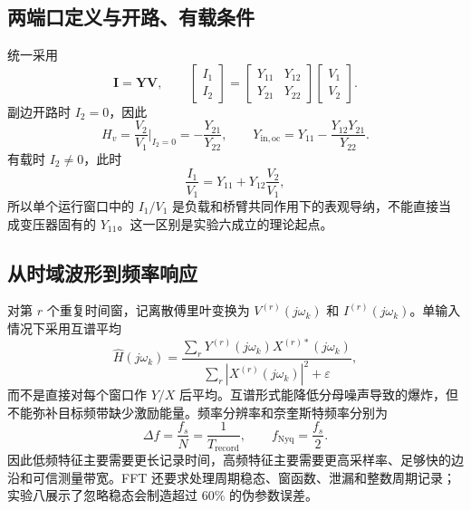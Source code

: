 \documentclass[UTF8,a4paper,12pt]{ctexart}
\begin{document}
\subsection{两端口定义与开路、有载条件}

统一采用
\begin{equation}
\mathbf I=\mathbf Y\mathbf V,\qquad
\begin{bmatrix}I_1\\I_2\end{bmatrix}
=
\begin{bmatrix}Y_{11}&Y_{12}\\Y_{21}&Y_{22}\end{bmatrix}
\begin{bmatrix}V_1\\V_2\end{bmatrix}.
\label{eq:two-port-basic}
\end{equation}
副边开路时 $I_2=0$，因此
\begin{equation}
H_v=\frac{V_2}{V_1}\bigg|_{I_2=0}=-\frac{Y_{21}}{Y_{22}},\qquad
Y_{\mathrm{in,oc}}=Y_{11}-\frac{Y_{12}Y_{21}}{Y_{22}}.
\end{equation}
有载时 $I_2\neq0$，此时
\begin{equation}
\frac{I_1}{V_1}=Y_{11}+Y_{12}\frac{V_2}{V_1},
\end{equation}
所以单个运行窗口中的 $I_1/V_1$ 是负载和桥臂共同作用下的表观导纳，不能直接当成变压器固有的 $Y_{11}$。这一区别是实验六成立的理论起点。

\subsection{从时域波形到频率响应}

对第 $r$ 个重复时间窗，记离散傅里叶变换为 $V^{(r)}(j\omega_k)$ 和 $I^{(r)}(j\omega_k)$。单输入情况下采用互谱平均
\begin{equation}
\hat H(j\omega_k)=
\frac{\sum_r Y^{(r)}(j\omega_k)X^{(r)*}(j\omega_k)}
{\sum_r|X^{(r)}(j\omega_k)|^2+\varepsilon},
\end{equation}
而不是直接对每个窗口作 $Y/X$ 后平均。互谱形式能降低分母噪声导致的爆炸，但不能弥补目标频带缺少激励能量。频率分辨率和奈奎斯特频率分别为
\begin{equation}
\Delta f=\frac{f_s}{N}=\frac{1}{T_{\mathrm{record}}},\qquad
f_{\mathrm{Nyq}}=\frac{f_s}{2}.
\end{equation}
因此低频特征主要需要更长记录时间，高频特征主要需要更高采样率、足够快的边沿和可信测量带宽。FFT 还要求处理周期稳态、窗函数、泄漏和整数周期记录；实验八展示了忽略稳态会制造超过 $60\%$ 的伪参数误差。
\end{document}

